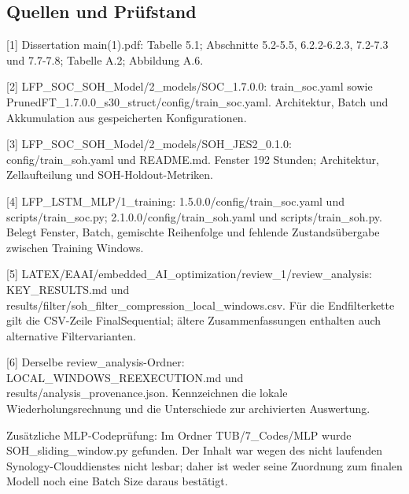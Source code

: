 \documentclass[11pt,a4paper]{article}
\begin{document}
\subsection*{Quellen und Prüfstand}\begingroup\fontsize{9.5}{11.5}\selectfont\setlength{\parskip}{4pt}
[1] Dissertation main(1).pdf: Tabelle 5.1; Abschnitte 5.2-5.5, 6.2.2-6.2.3, 7.2-7.3 und 7.7-7.8; Tabelle A.2; Abbildung A.6.

[2] LFP\_\allowbreak{}SOC\_\allowbreak{}SOH\_\allowbreak{}Model/\allowbreak{}2\_\allowbreak{}models/\allowbreak{}SOC\_\allowbreak{}1.7.0.0: train\_\allowbreak{}soc.yaml sowie PrunedFT\_\allowbreak{}1.7.0.0\_\allowbreak{}s30\_\allowbreak{}struct/\allowbreak{}config/\allowbreak{}train\_\allowbreak{}soc.yaml. Architektur, Batch und Akkumulation aus gespeicherten Konfigurationen.

[3] LFP\_\allowbreak{}SOC\_\allowbreak{}SOH\_\allowbreak{}Model/\allowbreak{}2\_\allowbreak{}models/\allowbreak{}SOH\_\allowbreak{}JES2\_\allowbreak{}0.1.0: config/\allowbreak{}train\_\allowbreak{}soh.yaml und README.md. Fenster 192 Stunden; Architektur, Zellaufteilung und SOH-Holdout-Metriken.

[4] LFP\_\allowbreak{}LSTM\_\allowbreak{}MLP/\allowbreak{}1\_\allowbreak{}training: 1.5.0.0/\allowbreak{}config/\allowbreak{}train\_\allowbreak{}soc.yaml und scripts/\allowbreak{}train\_\allowbreak{}soc.py; 2.1.0.0/\allowbreak{}config/\allowbreak{}train\_\allowbreak{}soh.yaml und scripts/\allowbreak{}train\_\allowbreak{}soh.py. Belegt Fenster, Batch, gemischte Reihenfolge und fehlende Zustandsübergabe zwischen Training Windows.

[5] LATEX/\allowbreak{}EAAI/\allowbreak{}embedded\_\allowbreak{}AI\_\allowbreak{}optimization/\allowbreak{}review\_\allowbreak{}1/\allowbreak{}review\_\allowbreak{}analysis: KEY\_\allowbreak{}RESULTS.md und results/\allowbreak{}filter/\allowbreak{}soh\_\allowbreak{}filter\_\allowbreak{}compression\_\allowbreak{}local\_\allowbreak{}windows.csv. Für die Endfilterkette gilt die CSV-Zeile FinalSequential; ältere Zusammenfassungen enthalten auch alternative Filtervarianten.

[6] Derselbe review\_\allowbreak{}analysis-Ordner: LOCAL\_\allowbreak{}WINDOWS\_\allowbreak{}REEXECUTION.md und results/\allowbreak{}analysis\_\allowbreak{}provenance.json. Kennzeichnen die lokale Wiederholungsrechnung und die Unterschiede zur archivierten Auswertung.

Zusätzliche MLP-Codeprüfung: Im Ordner TUB/\allowbreak{}7\_\allowbreak{}Codes/\allowbreak{}MLP wurde SOH\_\allowbreak{}sliding\_\allowbreak{}window.py gefunden. Der Inhalt war wegen des nicht laufenden Synology-Clouddienstes nicht lesbar; daher ist weder seine Zuordnung zum finalen Modell noch eine Batch Size daraus bestätigt.
\end{document}
